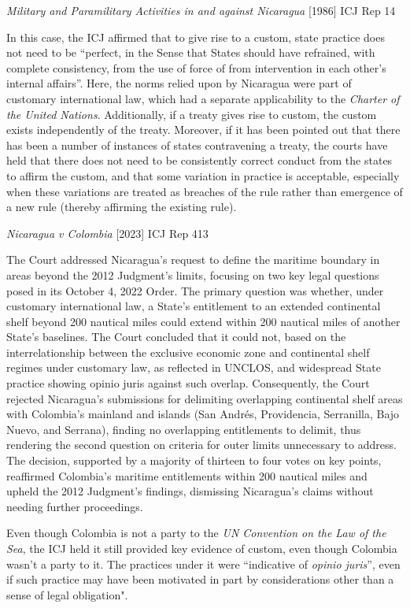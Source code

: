 \begin{casedetails}{\textit{Military and Paramilitary Activities in and against Nicaragua} [1986] ICJ Rep 14}
    \tcblower

    \flushleft
    In this case, the ICJ affirmed that to give rise to a custom, state practice does not need to be ``perfect, in the Sense that States should have refrained, with complete consistency, from the use of force of from intervention in each other's internal affairs''. Here, the norms relied upon by Nicaragua were part of customary international law, which had a separate applicability to the \textit{Charter of the United Nations}. Additionally, if a treaty gives rise to custom, the custom exists independently of the treaty. Moreover, if it has been pointed out that there has been a number of instances of states contravening a treaty, the courts have held that there does not need to be consistently correct conduct from the states to affirm the custom, and that some variation in practice is acceptable, especially when these variations are treated as breaches of the rule rather than emergence of a new rule (thereby affirming the existing rule).
\end{casedetails}

\begin{casedetails}{\textit{Nicaragua v Colombia} [2023] ICJ Rep 413}
    \flushleft

    The Court addressed Nicaragua's request to define the maritime boundary in areas beyond the 2012 Judgment's limits, focusing on two key legal questions posed in its October 4, 2022 Order. The primary question was whether, under customary international law, a State's entitlement to an extended continental shelf beyond 200 nautical miles could extend within 200 nautical miles of another State's baselines. The Court concluded that it could not, based on the interrelationship between the exclusive economic zone and continental shelf regimes under customary law, as reflected in UNCLOS, and widespread State practice showing opinio juris against such overlap. Consequently, the Court rejected Nicaragua's submissions for delimiting overlapping continental shelf areas with Colombia's mainland and islands (San Andrés, Providencia, Serranilla, Bajo Nuevo, and Serrana), finding no overlapping entitlements to delimit, thus rendering the second question on criteria for outer limits unnecessary to address. The decision, supported by a majority of thirteen to four votes on key points, reaffirmed Colombia's maritime entitlements within 200 nautical miles and upheld the 2012 Judgment's findings, dismissing Nicaragua's claims without needing further proceedings.

    \tcblower
    \flushleft

    Even though Colombia is not a party to the \textit{UN Convention on the Law of the Sea}, the ICJ held it still provided key evidence of custom, even though Colombia wasn't a party to it. The practices under it were ``indicative of \textit{opinio juris}'', even if such practice may have been motivated in part by considerations other than a sense of legal obligation".
\end{casedetails}

